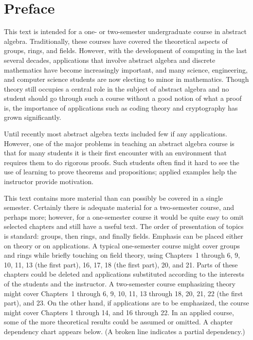 \chapter*{Preface}
 
 
 
 
 
This text is intended for a one- or two-semester undergraduate course
in  abstract algebra. Traditionally, these courses have covered the
theoretical aspects of groups, rings, and fields.  However, with the
development of computing in the last several decades, applications
that involve abstract algebra and discrete mathematics have become
increasingly important, and many science, engineering, and computer 
science students are now electing to minor in mathematics. Though
theory still occupies a central role in the subject of abstract
algebra and no student should go through such a course without a good
notion of what a proof is, the importance of applications such as
coding theory and cryptography has grown significantly.


Until recently most abstract algebra texts included few if any
applications. However, one of the major problems in teaching an
abstract algebra course is that for many students it is their first
encounter with an environment that requires them to do rigorous
proofs. Such students often find it hard to see the use of learning to
prove theorems and propositions; applied examples help the instructor
provide motivation. 
 
 

This text contains more material than can
possibly be covered in a single semester.  Certainly there is adequate
material for a two-semester course, and perhaps more; however, for a
one-semester course it would be quite easy to omit selected chapters
and still have a useful text.  The order of presentation of topics is
standard: groups, then rings, and finally fields. Emphasis can be
placed either on theory or on applications. A typical one-semester
course might cover groups and rings while briefly touching on field
theory, using Chapters~1 through 6, 9, 10, 11, 13 (the first part), 16, 17,
18 (the first part), 20, and 21. Parts of these chapters could be
deleted and applications substituted according to the interests of the
students and the instructor. A two-semester course emphasizing theory
might cover Chapters~1 through 6, 9, 10, 11, 13 through 18, 20, 21, 22 (the
first part), and 23. On the other hand, if applications are to be
emphasized, the course might cover Chapters 1 through 14, and 16
through 22. In an applied course, some of the more theoretical results
could be assumed or omitted. A chapter dependency chart appears below.
(A broken line indicates a partial dependency.)  



